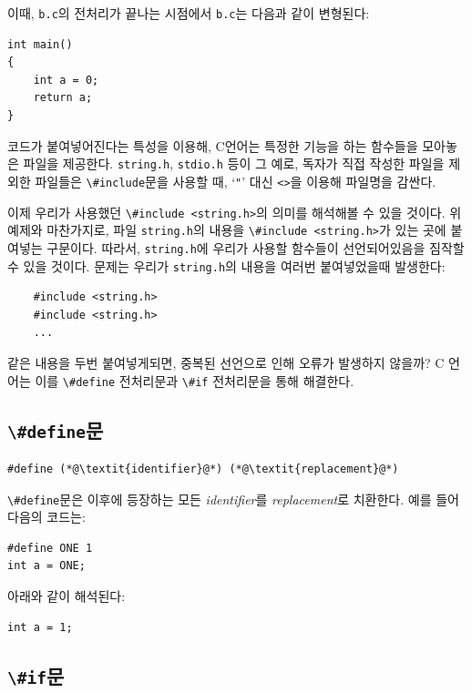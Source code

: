 \documentclass[a4paper,12pt]{book}
\newcommand{\V}[1]{\Verb|#1|}
\begin{document}
    이때, \V{b.c}의 전처리가 끝나는 시점에서 \V{b.c}는 다음과 같이 변형된다:

    \begin{lstlisting}
int main()
{
    int a = 0;
    return a;
}
    \end{lstlisting}

    코드가 붙여넣어진다는 특성을 이용해,
    C언어는 특정한 기능을 하는 함수들을 모아놓은 파일을 제공한다.
    \V{string.h}, \V{stdio.h} 등이 그 예로,
    독자가 직접 작성한 파일을 제외한 파일들은 \V{\#include}문을 사용할 때,
    `\V{"}' 대신 \V{<>}을 이용해 파일명을 감싼다.

    이제 우리가 사용했던 \V{\#include <string.h>}의 의미를 해석해볼 수 있을 것이다.
    위 예제와 마찬가지로, 파일 \V{string.h}의 내용을 \V{\#include <string.h>}가 있는 곳에 붙여넣는 구문이다.
    따라서, \V{string.h}에 우리가 사용할 함수들이 선언되어있음을 짐작할 수 있을 것이다.
    문제는 우리가 \V{string.h}의 내용을 여러번 붙여넣었을때 발생한다:

        \begin{lstlisting}
    #include <string.h>
    #include <string.h>
    ...
    \end{lstlisting}

    같은 내용을 두번 붙여넣게되면, 중복된 선언으로 인해 오류가 발생하지 않을까?
    C 언어는 이를 \V{\#define} 전처리문과 \V{\#if} 전처리문을 통해 해결한다.

    \subsection{\V{\#define}문}

        \begin{lstlisting}  
#define (*@\textit{identifier}@*) (*@\textit{replacement}@*)
        \end{lstlisting}

        \V{\#define}문은 이후에 등장하는 모든 \textit{identifier}를 \textit{replacement}로 치환한다.
        예를 들어 다음의 코드는:

        \begin{lstlisting}
#define ONE 1
int a = ONE;
        \end{lstlisting}

        아래와 같이 해석된다:

        \begin{lstlisting}
int a = 1;
        \end{lstlisting}

    \subsection{\V{\#if}문}
\end{document}
